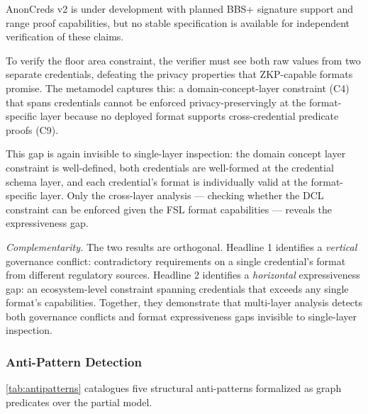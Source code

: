 AnonCreds v2 is under development with planned BBS+ signature support and range proof capabilities, but no stable specification is available for independent verification of these claims.

To verify the floor area constraint, the verifier must see both raw values from two separate credentials, defeating the privacy properties that ZKP-capable formats promise. The metamodel captures this: a domain-concept-layer constraint (C4) that spans credentials cannot be enforced privacy-preservingly at the format-specific layer because no deployed format supports cross-credential predicate proofs (C9).

This gap is again invisible to single-layer inspection: the domain concept layer constraint is well-defined, both credentials are well-formed at the credential schema layer, and each credential's format is individually valid at the format-specific layer. Only the cross-layer analysis --- checking whether the DCL constraint can be enforced given the FSL format capabilities --- reveals the expressiveness gap.

\emph{Complementarity.} The two results are orthogonal. Headline 1 identifies a \emph{vertical} governance conflict: contradictory requirements on a single credential's format from different regulatory sources. Headline 2 identifies a \emph{horizontal} expressiveness gap: an ecosystem-level constraint spanning credentials that exceeds any single format's capabilities. Together, they demonstrate that multi-layer analysis detects both governance conflicts and format expressiveness gaps invisible to single-layer inspection.

\subsubsection{Anti-Pattern Detection}\label{anti-pattern-detection}

\label{sec:anti-patterns}

\autoref{tab:antipatterns} catalogues five structural anti-patterns formalized as graph predicates over the partial model.

